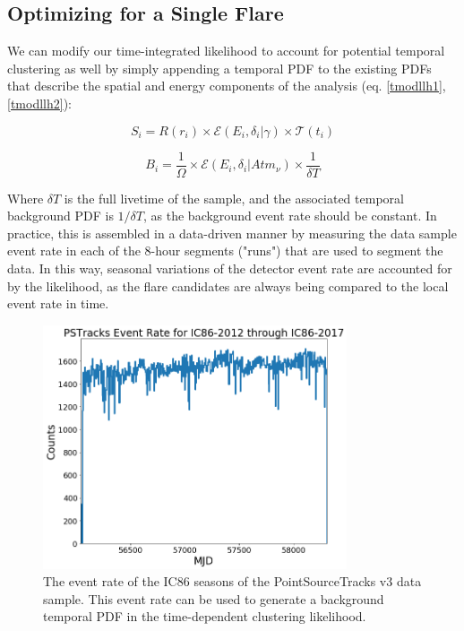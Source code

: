 \subsection{Optimizing for a Single Flare}
We can modify our time-integrated likelihood to account for potential temporal clustering as well by simply appending a temporal PDF to the existing PDFs that describe the spatial and energy components of the analysis (eq. \ref{tmodllh1}, \ref{tmodllh2}):

\begin{equation}
    S_i = R(r_i) \times \mathcal{E}(E_i, \delta_i|\gamma) \times \mathcal{T}(t_i)
    \label{tmodllh1}
\end{equation}

\begin{equation}
    B_i = \frac{1}{\Omega}\times \mathcal{E}(E_i,\delta_i|Atm_{\nu}) \times \frac{1}{\delta T}
    \label{tmodllh2}
\end{equation}

Where $\delta T$ is the full livetime of the sample, and the associated temporal background PDF is $1/\delta T$, as the background event rate should be constant. In practice, this is assembled in a data-driven manner by measuring the data sample event rate in each of the 8-hour segments ("runs") that are used to segment the data. In this way, seasonal variations of the detector event rate are accounted for by the likelihood, as the flare candidates are always being compared to the local event rate in time.

\begin{figure}[h]
\centering
\includegraphics[width=0.8\textwidth]{figs/evt_rate.png}
\caption{The event rate of the IC86 seasons of the PointSourceTracks v3 data sample. This event rate can be used to generate a background temporal PDF in the time-dependent clustering likelihood.}
\label{fig:evt_rate}
\end{figure}

